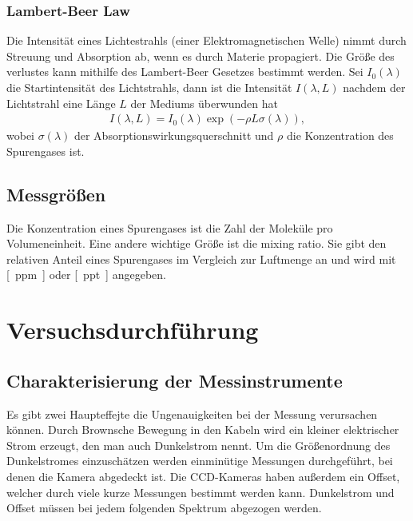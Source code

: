 \documentclass[12pt, a4paper, bibliography=totoc]{scrartcl}
\begin{document}
\begin{multicols}{2}
\subsubsection{Lambert-Beer Law}
Die Intensität eines Lichtestrahls (einer Elektromagnetischen Welle) nimmt durch Streuung und Absorption ab, wenn es durch Materie propagiert. 
Die Größe des verlustes kann mithilfe des Lambert-Beer Gesetzes bestimmt werden.
    Sei $I_0 (\lambda)$ die Startintensität des Lichtstrahls, dann ist die Intensität $I(\lambda, L)$ nachdem der Lichtstrahl eine Länge $L$ der Mediums überwunden hat
    \begin{align}
        I(\lambda, L) = I_0 (\lambda) \exp (- \rho L \sigma (\lambda)),
    \end{align}
    wobei $\sigma (\lambda)$ der Absorptionswirkungsquerschnitt und $\rho$ die Konzentration des Spurengases ist.

\subsection{Messgrößen}
Die Konzentration eines Spurengases ist die Zahl der Moleküle pro Volumeneinheit.
Eine andere wichtige Größe ist die mixing ratio.
Sie gibt den relativen Anteil eines Spurengases im Vergleich zur Luftmenge an und wird mit \si{[ppm]} oder \si{[ppt]} angegeben. 

\section{Versuchsdurchführung}
\subsection{Charakterisierung der Messinstrumente}
 Es gibt zwei Haupteffejte die Ungenauigkeiten bei der Messung verursachen können.
Durch Brownsche Bewegung in den Kabeln wird ein kleiner elektrischer Strom erzeugt, den man auch Dunkelstrom nennt.
Um die Größenordnung des Dunkelstromes einzuschätzen werden einminütige Messungen durchgeführt, bei denen die Kamera abgedeckt ist.
Die CCD-Kameras haben außerdem ein Offset, welcher durch viele kurze Messungen bestimmt werden kann.
Dunkelstrom und Offset müssen bei jedem folgenden Spektrum abgezogen werden.



\end{multicols}
\end{document}
